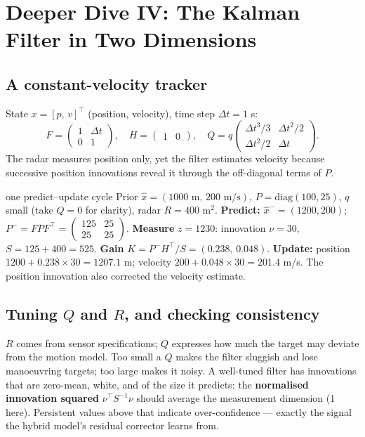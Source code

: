 \documentclass[11pt]{article}
\begin{document}
\section{Deeper Dive IV: The Kalman Filter in Two Dimensions}
\subsection{A constant-velocity tracker}
State $x=[p,\,v]^\top$ (position, velocity), time step $\Delta t=1$ s:
\[F=\begin{pmatrix}1&\Delta t\\0&1\end{pmatrix},\quad H=\begin{pmatrix}1&0\end{pmatrix},\quad Q=q\begin{pmatrix}\Delta t^3/3&\Delta t^2/2\\\Delta t^2/2&\Delta t\end{pmatrix}.\]
The radar measures position only, yet the filter estimates velocity because successive position innovations reveal it through the off-diagonal terms of $P$.
\begin{example}{one predict--update cycle}
Prior $\hat x=(1000\text{ m},\,200\text{ m/s})$, $P=\text{diag}(100,25)$, $q$ small (take $Q=0$ for clarity), radar $R=400$ m$^2$. \textbf{Predict:} $\hat x^-=(1200,200)$; $P^-=FPF^\top=\begin{pmatrix}125&25\\25&25\end{pmatrix}$. \textbf{Measure} $z=1230$: innovation $\nu=30$, $S=125+400=525$. \textbf{Gain} $K=P^-H^\top/S=(0.238,\,0.048)$. \textbf{Update:} position $1200+0.238\times30=1207.1$ m; velocity $200+0.048\times30=201.4$ m/s. The position innovation also corrected the velocity estimate.
\end{example}

\subsection{Tuning $Q$ and $R$, and checking consistency}
$R$ comes from sensor specifications; $Q$ expresses how much the target may deviate from the motion model. Too small a $Q$ makes the filter sluggish and lose manoeuvring targets; too large makes it noisy. A well-tuned filter has innovations that are zero-mean, white, and of the size it predicts: the \textbf{normalised innovation squared} $\nu^\top S^{-1}\nu$ should average the measurement dimension (1 here). Persistent values above that indicate over-confidence --- exactly the signal the hybrid model's residual corrector learns from.
\end{document}
